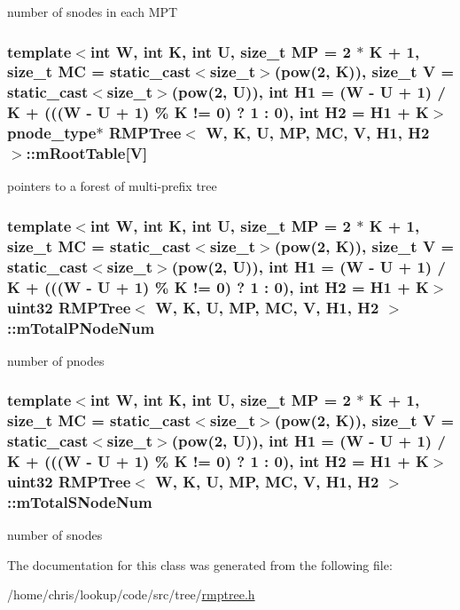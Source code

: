 number of snodes in each M\-P\-T 

\hypertarget{classRMPTree_a4241c1689e08498084c51399549ae6b7}{
\subsubsection[{m\-Root\-Table}]{\setlength{\rightskip}{0pt plus 5cm}template$<$int W, int K, int U, size\-\_\-t M\-P = 2 $\ast$ K + 1, size\-\_\-t M\-C = static\-\_\-cast$<$size\-\_\-t$>$(pow(2, K)), size\-\_\-t V = static\-\_\-cast$<$size\-\_\-t$>$(pow(2, U)), int H1 = (\-W -\/ U + 1) / K + (((\-W -\/ U + 1) \% K != 0) ? 1 \-: 0), int H2 = H1 + K$>$ {\bf pnode\-\_\-type}$\ast$ {\bf R\-M\-P\-Tree}$<$ {\bf W}, K, U, M\-P, M\-C, V, H1, H2 $>$\-::m\-Root\-Table\mbox{[}V\mbox{]}\hspace{0.3cm}{\ttfamily [private]}}}\label{classRMPTree_a4241c1689e08498084c51399549ae6b7}


pointers to a forest of multi-\/prefix tree 

\hypertarget{classRMPTree_a583509c36d3ec16fe35ca64ae7d71977}{
\subsubsection[{m\-Total\-P\-Node\-Num}]{\setlength{\rightskip}{0pt plus 5cm}template$<$int W, int K, int U, size\-\_\-t M\-P = 2 $\ast$ K + 1, size\-\_\-t M\-C = static\-\_\-cast$<$size\-\_\-t$>$(pow(2, K)), size\-\_\-t V = static\-\_\-cast$<$size\-\_\-t$>$(pow(2, U)), int H1 = (\-W -\/ U + 1) / K + (((\-W -\/ U + 1) \% K != 0) ? 1 \-: 0), int H2 = H1 + K$>$ {\bf uint32} {\bf R\-M\-P\-Tree}$<$ {\bf W}, K, U, M\-P, M\-C, V, H1, H2 $>$\-::m\-Total\-P\-Node\-Num\hspace{0.3cm}{\ttfamily [private]}}}\label{classRMPTree_a583509c36d3ec16fe35ca64ae7d71977}


number of pnodes 

\hypertarget{classRMPTree_af7293f2b7c8212daaccc3d014a9ca089}{
\subsubsection[{m\-Total\-S\-Node\-Num}]{\setlength{\rightskip}{0pt plus 5cm}template$<$int W, int K, int U, size\-\_\-t M\-P = 2 $\ast$ K + 1, size\-\_\-t M\-C = static\-\_\-cast$<$size\-\_\-t$>$(pow(2, K)), size\-\_\-t V = static\-\_\-cast$<$size\-\_\-t$>$(pow(2, U)), int H1 = (\-W -\/ U + 1) / K + (((\-W -\/ U + 1) \% K != 0) ? 1 \-: 0), int H2 = H1 + K$>$ {\bf uint32} {\bf R\-M\-P\-Tree}$<$ {\bf W}, K, U, M\-P, M\-C, V, H1, H2 $>$\-::m\-Total\-S\-Node\-Num\hspace{0.3cm}{\ttfamily [private]}}}\label{classRMPTree_af7293f2b7c8212daaccc3d014a9ca089}


number of snodes 



The documentation for this class was generated from the following file\-:\begin{DoxyCompactItemize}
\item 
/home/chris/lookup/code/src/tree/\hyperlink{rmptree_8h}{rmptree.\-h}\end{DoxyCompactItemize}

